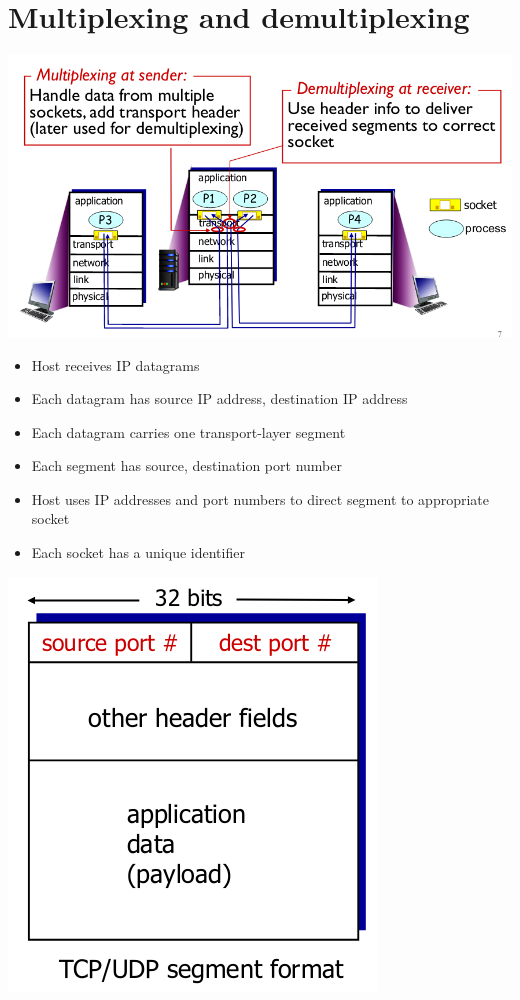 \documentclass{article}[18pt]
\begin{document}
\section{Multiplexing and demultiplexing}
\begin{center}
	\includegraphics[scale=0.7]{multiplexing}
\end{center}
\begin{itemize}
	\item Host receives IP datagrams
	\item Each datagram has source IP address, destination IP address
	\item Each datagram carries one transport-layer segment
	\item Each segment has source, destination port number
	\item Host uses IP addresses and port numbers to direct segment to appropriate socket
	\item Each socket has a unique identifier
\end{itemize}
\begin{center}
	\includegraphics[scale=0.7]{segment}
\end{center}
\end{document}
